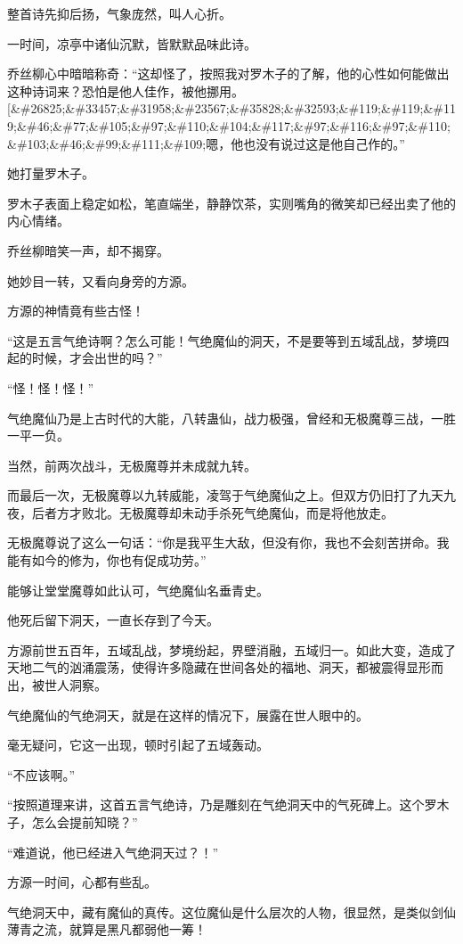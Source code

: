 \begin{this_body}
整首诗先抑后扬，气象庞然，叫人心折。

一时间，凉亭中诸仙沉默，皆默默品味此诗。

乔丝柳心中暗暗称奇：“这却怪了，按照我对罗木子的了解，他的心性如何能做出这种诗词来？恐怕是他人佳作，被他挪用。[\&\#26825;\&\#33457;\&\#31958;\&\#23567;\&\#35828;\&\#32593;\&\#119;\&\#119;\&\#119;\&\#46;\&\#77;\&\#105;\&\#97;\&\#110;\&\#104;\&\#117;\&\#97;\&\#116;\&\#97;\&\#110;\&\#103;\&\#46;\&\#99;\&\#111;\&\#109;嗯，他也没有说过这是他自己作的。”

她打量罗木子。

罗木子表面上稳定如松，笔直端坐，静静饮茶，实则嘴角的微笑却已经出卖了他的内心情绪。

乔丝柳暗笑一声，却不揭穿。

她妙目一转，又看向身旁的方源。

方源的神情竟有些古怪！

“这是五言气绝诗啊？怎么可能！气绝魔仙的洞天，不是要等到五域乱战，梦境四起的时候，才会出世的吗？”

“怪！怪！怪！”

气绝魔仙乃是上古时代的大能，八转蛊仙，战力极强，曾经和无极魔尊三战，一胜一平一负。

当然，前两次战斗，无极魔尊并未成就九转。

而最后一次，无极魔尊以九转威能，凌驾于气绝魔仙之上。但双方仍旧打了九天九夜，后者方才败北。无极魔尊却未动手杀死气绝魔仙，而是将他放走。

无极魔尊说了这么一句话：“你是我平生大敌，但没有你，我也不会刻苦拼命。我能有如今的修为，你也有促成功劳。”

能够让堂堂魔尊如此认可，气绝魔仙名垂青史。

他死后留下洞天，一直长存到了今天。

方源前世五百年，五域乱战，梦境纷起，界壁消融，五域归一。如此大变，造成了天地二气的汹涌震荡，使得许多隐藏在世间各处的福地、洞天，都被震得显形而出，被世人洞察。

气绝魔仙的气绝洞天，就是在这样的情况下，展露在世人眼中的。

毫无疑问，它这一出现，顿时引起了五域轰动。

“不应该啊。”

“按照道理来讲，这首五言气绝诗，乃是雕刻在气绝洞天中的气死碑上。这个罗木子，怎么会提前知晓？”

“难道说，他已经进入气绝洞天过？！”

方源一时间，心都有些乱。

气绝洞天中，藏有魔仙的真传。这位魔仙是什么层次的人物，很显然，是类似剑仙薄青之流，就算是黑凡都弱他一筹！


\end{this_body}
